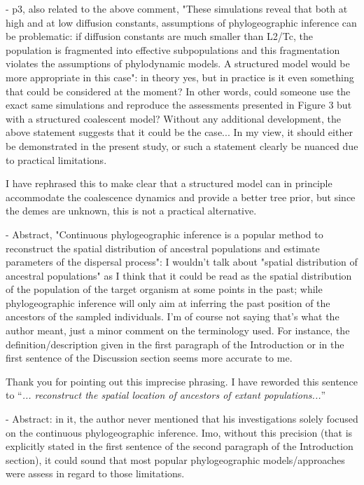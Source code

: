 \documentclass[11pt, oneside]{article}   	%
\newcommand{\response}[1]{{\color{black}{\bf Response:} #1}}
\begin{document}
- p3, also related to the above comment, "These simulations reveal that both at high and at low diffusion constants, assumptions of phylogeographic inference can be problematic: if diffusion constants are much smaller than L2/Tc, the population is fragmented into effective subpopulations and this fragmentation violates the assumptions of phylodynamic models. A structured model would be more appropriate in this case": in theory yes, but in practice is it even something that could be considered at the moment? In other words, could someone use the exact same simulations and reproduce the assessments presented in Figure 3 but with a structured coalescent model? Without any additional development, the above statement suggests that it could be the case... In my view, it should either be demonstrated in the present study, or such a statement clearly be nuanced due to practical limitations.

\response{I have rephrased this to make clear that a structured model can in principle accommodate the coalescence dynamics and provide a better tree prior, but since the demes are unknown, this is not a practical alternative.}


- Abstract, "Continuous phylogeographic inference is a popular method to reconstruct the spatial distribution of ancestral populations and estimate parameters of the dispersal process": I wouldn't talk about "spatial distribution of ancestral populations" as I think that it could be read as the spatial distribution of the population of the target organism at some points in the past; while phylogeographic inference will only aim at inferring the past position of the ancestors of the sampled individuals. I'm of course not saying that's what the author meant, just a minor comment on the terminology used. For instance, the definition/description given in the first paragraph of the Introduction or in the first sentence of the Discussion section seems more accurate to me.

\response{Thank you for pointing out this imprecise phrasing. I have reworded this sentence to ``\emph{... reconstruct the spatial location of ancestors of extant populations...}''}

- Abstract: in it, the author never mentioned that his investigations solely focused on the continuous phylogeographic inference. Imo, without this precision (that is explicitly stated in the first sentence of the second paragraph of the Introduction section), it could sound that most popular phylogeographic models/approaches were assess in regard to those limitations.
\end{document}
